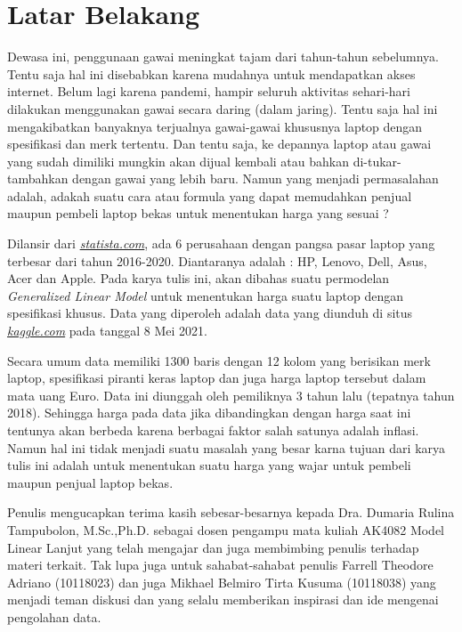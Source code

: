 \documentclass[12pt]{article}
\begin{document}
\section{Latar Belakang}
Dewasa ini, penggunaan gawai meningkat tajam dari tahun-tahun sebelumnya. Tentu saja hal ini disebabkan karena mudahnya untuk mendapatkan akses internet. Belum lagi karena pandemi, hampir seluruh aktivitas sehari-hari dilakukan menggunakan gawai secara daring (dalam jaring). Tentu saja hal ini mengakibatkan banyaknya terjualnya gawai-gawai khususnya laptop dengan spesifikasi dan merk tertentu. Dan tentu saja, ke depannya laptop atau gawai yang sudah dimiliki mungkin akan dijual kembali atau bahkan di-tukar-tambahkan dengan gawai yang lebih baru. Namun yang menjadi permasalahan adalah, adakah suatu cara atau formula yang dapat memudahkan penjual maupun pembeli laptop bekas untuk menentukan harga yang sesuai ?  
\par
Dilansir dari \textit{\href{https://www.statista.com/statistics/818439/global-notebook-computer-shipment-share-by-brands/}{statista.com}}, ada 6 perusahaan dengan pangsa pasar laptop yang terbesar dari tahun 2016-2020. Diantaranya adalah : HP, Lenovo, Dell, Asus, Acer dan Apple. Pada karya tulis ini, akan dibahas suatu permodelan \textit{Generalized Linear Model} untuk menentukan harga suatu laptop dengan spesifikasi khusus. Data yang diperoleh adalah data yang diunduh di situs \textit{\href{https://www.kaggle.com/ionaskel/laptop-prices}{kaggle.com}} pada tanggal 8 Mei 2021.  
\par 
Secara umum data memiliki 1300 baris dengan 12 kolom yang berisikan merk laptop, spesifikasi piranti keras laptop dan juga harga laptop tersebut dalam mata uang Euro. Data ini diunggah oleh pemiliknya 3 tahun lalu (tepatnya tahun 2018). Sehingga harga pada data jika dibandingkan dengan harga saat ini tentunya akan berbeda karena berbagai faktor salah satunya adalah inflasi. Namun hal ini tidak menjadi suatu masalah yang besar karna tujuan dari karya tulis ini adalah untuk menentukan suatu harga yang wajar untuk pembeli maupun penjual laptop bekas.  
\par   
Penulis mengucapkan terima kasih sebesar-besarnya kepada Dra. Dumaria Rulina Tampubolon, M.Sc.,Ph.D. sebagai dosen pengampu mata kuliah AK4082 Model Linear Lanjut yang telah mengajar dan juga membimbing penulis terhadap materi terkait. Tak lupa juga untuk sahabat-sahabat penulis Farrell Theodore Adriano (10118023) dan juga Mikhael Belmiro Tirta Kusuma (10118038) yang menjadi teman diskusi dan yang selalu memberikan inspirasi dan ide mengenai pengolahan data.
\end{document}
